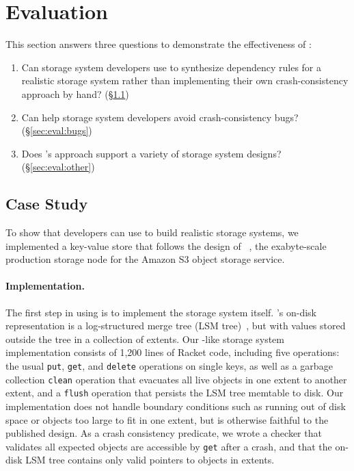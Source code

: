 \section{Evaluation}\label{sec:eval}

This section answers three questions to demonstrate the effectiveness of \depsynth:
\begin{enumerate}[left=0pt]
\item Can storage system developers use \depsynth to synthesize dependency rules for a realistic storage system
      rather than implementing their own crash-consistency approach by hand? (\S\ref{sec:eval:shardstore})
\item Can \depsynth help storage system developers avoid crash-consistency bugs? (\S\ref{sec:eval:bugs})
\item Does \depsynth's approach support a variety of storage system designs? (\S\ref{sec:eval:other})
\end{enumerate}

\subsection{\shardstore Case Study}\label{sec:eval:shardstore}

To show that developers can use \depsynth to build realistic storage systems, 
we implemented a key-value store that follows the design of \shardstore~\cite{bornholt:s3},
the exabyte-scale production storage node for the Amazon S3 object storage service.

\paragraph{Implementation.}
The first step in using \depsynth is to implement the storage system itself.
\shardstore's on-disk representation is a log-structured merge tree (LSM tree)~\cite{oneil:lsm},
but with values stored outside the tree in a collection of extents.
Our \shardstore-like storage system implementation
consists of 1,200 lines of Racket code, including
five operations:
the usual \texttt{put}, \texttt{get}, and \texttt{delete} operations on single keys,
as well as a garbage collection \texttt{clean} operation that 
evacuates all live objects in one extent to another extent, %
and a \texttt{flush} operation that persists the LSM tree memtable to disk.
Our implementation does not handle boundary conditions
such as running out of disk space or objects too large to fit in one extent,
but is otherwise faithful to the published \shardstore design.
As a crash consistency predicate,
we wrote a checker that validates all expected objects are accessible by \texttt{get} after a crash,
and that the on-disk LSM tree contains only valid pointers to objects in extents.

